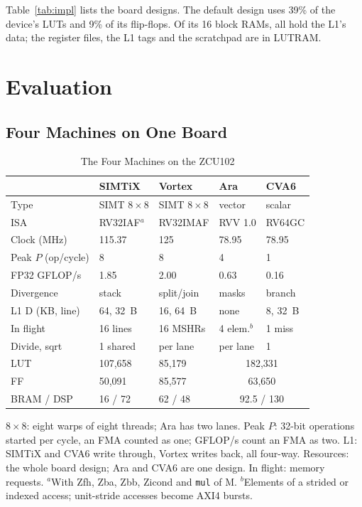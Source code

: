 \documentclass[journal]{IEEEtran}
\begin{document}
Table~\ref{tab:impl} lists the board designs. The default design uses 39\% of the
device's LUTs and 9\% of its flip-flops. Of its 16 block RAMs, all hold the L1's
data; the register files, the L1 tags and the scratchpad are in LUTRAM.

\section{Evaluation}\label{sec:eval}
\subsection{Four Machines on One Board}\label{sec:machines}
\begin{table}[t]
\caption{The Four Machines on the ZCU102}
\label{tab:machines}
\centering\footnotesize
\setlength{\tabcolsep}{3.0pt}
\begin{tabular}{lllll}
\toprule
 & SIMTiX & Vortex & Ara & CVA6\\
\midrule
Type & SIMT $8\times8$ & SIMT $8\times8$ & vector & scalar\\
ISA & RV32IAF$^a$ & RV32IMAF & RVV 1.0 & RV64GC\\
Clock (MHz) & 115.37 & 125 & 78.95 & 78.95\\
Peak $P$ (op/cycle) & 8 & 8 & 4 & 1\\
FP32 GFLOP/s & 1.85 & 2.00 & 0.63 & 0.16\\
Divergence & stack & split/join & masks & branch\\
L1 D (KB, line) & 64, 32~B & 16, 64~B & none & 8, 32~B\\
In flight & 16 lines & 16 MSHRs & 4 elem.$^b$ & 1 miss\\
Divide, sqrt & 1 shared & per lane & per lane & 1\\
\midrule
LUT & 107,658 & 85,179 & \multicolumn{2}{c}{182,331}\\
FF & 50,091 & 85,577 & \multicolumn{2}{c}{63,650}\\
BRAM / DSP & 16 / 72 & 62 / 48 & \multicolumn{2}{c}{92.5 / 130}\\
\bottomrule
\end{tabular}

\vspace{2pt}
\begin{minipage}{\columnwidth}\footnotesize
$8\times8$: eight warps of eight threads; Ara has two lanes. Peak $P$: 32-bit operations started per cycle,
an FMA counted as one; GFLOP/s count an FMA as two. L1: SIMTiX and CVA6 write through,
Vortex writes back, all four-way. Resources: the whole board design; Ara and CVA6 are
one design. In flight: memory requests. $^a$With Zfh, Zba, Zbb, Zicond and \texttt{mul} of M. $^b$Elements of a
strided or indexed access; unit-stride accesses become AXI4 bursts.
\end{minipage}
\end{table}
\end{document}
